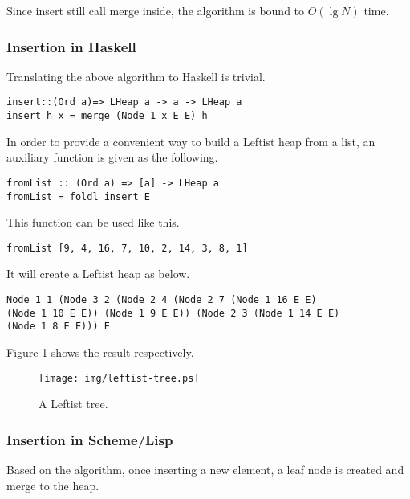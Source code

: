 \documentclass{article}
\begin{document}
Since insert still call merge inside, the algorithm is bound to $O(\lg N)$
time.

\subsubsection*{Insertion in Haskell}

Translating the above algorithm to Haskell is trivial.

\lstset{language=Haskell}
\begin{lstlisting}
insert::(Ord a)=> LHeap a -> a -> LHeap a
insert h x = merge (Node 1 x E E) h
\end{lstlisting}

In order to provide a convenient way to build a Leftist heap from
a list, an auxiliary function is given as the following.

\begin{lstlisting}
fromList :: (Ord a) => [a] -> LHeap a
fromList = foldl insert E
\end{lstlisting}

This function can be used like this.

\begin{lstlisting}
fromList [9, 4, 16, 7, 10, 2, 14, 3, 8, 1]
\end{lstlisting}

It will create a Leftist heap as below.

\begin{verbatim}
Node 1 1 (Node 3 2 (Node 2 4 (Node 2 7 (Node 1 16 E E) 
(Node 1 10 E E)) (Node 1 9 E E)) (Node 2 3 (Node 1 14 E E) 
(Node 1 8 E E))) E
\end{verbatim}

Figure \ref{fig:leftist-tree} shows the result respectively.

\begin{figure}[htbp]
   \begin{center}
   	  \texttt{[image: img/leftist-tree.ps]}
    \caption{A Leftist tree.} \label{fig:leftist-tree}
   \end{center}
\end{figure}

\subsubsection*{Insertion in Scheme/Lisp}

Based on the algorithm, once inserting a new element, a leaf node 
is created and merge to the heap.
\end{document}
